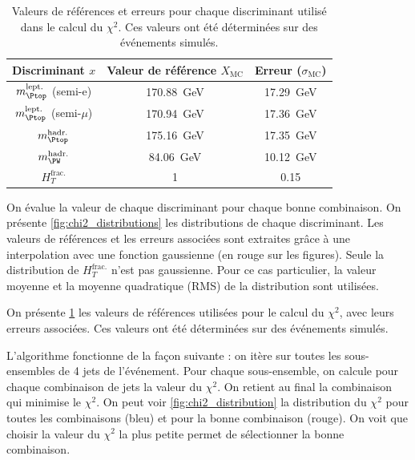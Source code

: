 \begin{table} \centering
    \begin{tabular}{@{}ccc@{}} \toprule
        Discriminant $x$& Valeur de référence $X_\text{MC}$ & Erreur ($\sigma_\text{MC}$) \\ \midrule
        $m_{\Ptop}^{\text{lept.}}$ (semi-e) & \SI{170.88}{\GeV} & \SI{17.29}{\GeV} \\
        $m_{\Ptop}^{\text{lept.}}$ (semi-$\mu$) & \SI{170.94}{\GeV} & \SI{17.36}{\GeV} \\
        $m_{\Ptop}^{\text{hadr.}}$ & \SI{175.16}{\GeV} & \SI{17.35}{\GeV} \\
        $m_{\PW}^{\text{hadr.}}$ & \SI{84.06}{\GeV} & \SI{10.12}{\GeV} \\
        $H_{T}^{\text{frac.}}$ & \num{1} & \num{0.15} \\ \bottomrule
    \end{tabular}
    \caption{Valeurs de références et erreurs pour chaque discriminant utilisé dans le calcul du $\chi^2$. Ces valeurs ont été déterminées sur des événements \ttbar simulés.}
    \label{tab:chi2_ref_values}
\end{table}

On évalue la valeur de chaque discriminant pour chaque bonne combinaison. On présente \cref{fig:chi2_distributions} les distributions de chaque discriminant. Les valeurs de références et les erreurs associées sont extraites grâce à une interpolation avec une fonction gaussienne (en rouge sur les figures). Seule la distribution de $H_T^\text{frac.}$ n'est pas gaussienne. Pour ce cas particulier, la valeur moyenne et la moyenne quadratique (RMS) de la distribution sont utilisées.


On présente \cref{tab:chi2_ref_values} les valeurs de références utilisées pour le calcul du $\chi^2$, avec leurs erreurs associées. Ces valeurs ont été déterminées sur des événements \ttbar simulés.

\bigskip

L'algorithme fonctionne de la façon suivante : on itère sur toutes les sous-ensembles de 4 jets de l'événement. Pour chaque sous-ensemble, on calcule pour chaque combinaison de jets la valeur du $\chi^2$. On retient au final la combinaison qui minimise le $\chi^2$. On peut voir \cref{fig:chi2_distribution} la distribution du $\chi^2$ pour toutes les combinaisons (bleu) et pour la bonne combinaison (rouge). On voit que choisir la valeur du $\chi^2$ la plus petite permet de sélectionner la bonne combinaison.

